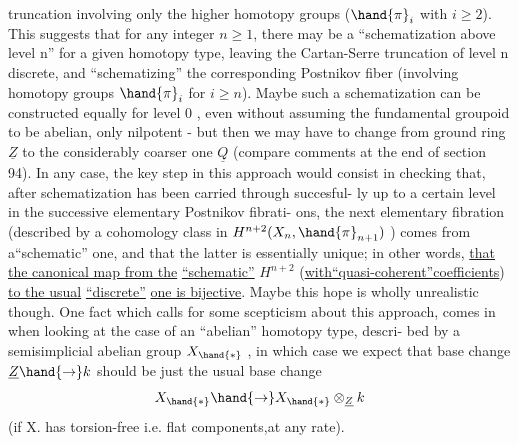 
truncation involving only the higher homotopy groups ($\hand{\pi}_i$ with $i\geqslant 2$).
This suggests that for any integer $n\geqslant 1$, there may be a ``schematization
above level n'' for a given homotopy type, leaving the Cartan-Serre
truncation of  level n discrete, and ``schematizing'' the
corresponding  Postnikov fiber (involving homotopy groups $\hand{\pi}_i$ for $i\geqslant n$).
Maybe such a schematization can be constructed equally for level 0 ,
even without assuming the fundamental groupoid to be abelian, 
only nilpotent - but then we may have to change from ground ring $\underline{Z}$ to
the considerably coarser one $\underline{Q}$ (compare comments at the end of section
94). In any case, the key step in this approach would consist in 
checking that, after schematization has been carried through succesful-%
ly up to a certain level in the successive elementary Postnikov fibrati-%
ons, the next elementary fibration (described by a cohomology class in
$H^{n+2}(X_n,\hand{\pi}_{n+1})$ ) comes from a``schematic'' one, and that the latter is
essentially unique; in other words, \uline{that the canonical map from the}
\uline{``schematic''} $H^{n+2}$ (\uline{with``quasi-coherent''coefficients}) \uline{to the usual}
\uline{``discrete''} \uline{one is bijective}. Maybe this hope is wholly unrealistic\hand{\unsure{,}}
though. One fact which calls for some scepticism about this approach,
comes in when looking at the case of an ``abelian'' homotopy type, descri-%
bed by a semisimplicial abelian group $X_{\hand{\ast}}$ , in which case we expect that
base change $\underline{Z}\hand{\rightarrow} k$ should be just the usual base change
\[ X_{\hand{\ast}} \hand{\rightarrow} X_{\hand{\ast}}\otimes_{\underline{Z}} k \]
(if X. has torsion-free  i.e. flat components,at any rate).
